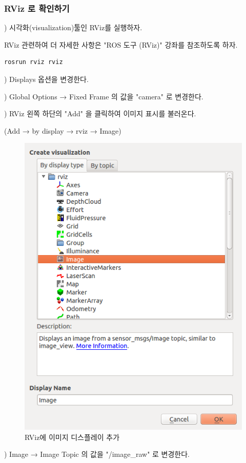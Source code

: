 \subsubsection{RViz 로 확인하기}

\setcounter{num}{0}

\noindent
{}\thenum) 시각화(visualization)툴인 RViz를 실행하자.

RViz 관련하여 더 자세한 사항은 "ROS 도구 (RViz)" 강좌를 참조하도록 하자.

\begin{lstlisting}[language=ROS]
rosrun rviz rviz
\end{lstlisting}

\noindent
{}\thenum) Displays 옵션을 변경한다.

\vspace{\baselineskip}
\noindent
{}) Global Options → Fixed Frame 의 값을 "camera" 로 변경한다.

\vspace{\baselineskip}
\noindent
{}) RViz 왼쪽 하단의 "Add" 을 클릭하여 이미지 표시를 불러온다.

\noindent
(Add → by display → rviz → Image)

\begin{figure}[h]
\centering\includegraphics[width=0.5\columnwidth]{pictures/chapter9/add_display_of_rviz.png}
\caption{RViz에 이미지 디스플레이 추가}
\end{figure}

\vspace{\baselineskip}
\noindent
{}) Image → Image Topic 의 값을 "/image\_raw" 로 변경한다.

